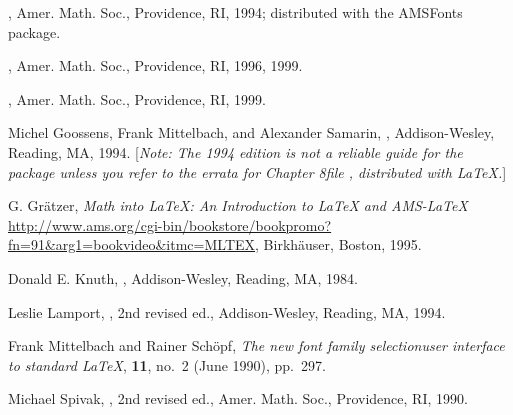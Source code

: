 \begin{thebibliography}{9}

,
Amer. Math. Soc., Providence, RI, 1994; distributed
with the AMSFonts package.

,
Amer. Math. Soc., Providence, RI, 1996, 1999.

,
Amer. Math. Soc., Providence, RI, 1999.

 Michel Goossens, Frank Mittelbach, and Alexander Samarin,
, Addison-Wesley, Reading, MA, 1994.
  [\emph{Note: The 1994 edition is not a reliable guide for the
     package unless you refer to the errata for Chapter
    8\mdash file , distributed with \LaTeX{}.}]

\begin{raggedright}
 G. Gr\"{a}tzer,
\emph{Math into \LaTeX{}: An Introduction to \LaTeX{} and AMS-\LaTeX{}}
  \url{http://www.ams.org/cgi-bin/bookstore/bookpromo?fn=91&arg1=bookvideo&itmc=MLTEX},
Birkh\"{a}user, Boston, 1995.\par
\end{raggedright}

 Donald E. Knuth, ,
Addison-Wesley, Reading, MA, 1984.

 Leslie Lamport, , 2nd revised ed., Addison-Wesley, Reading, MA, 1994.

 Frank Mittelbach and Rainer Sch\"opf,
\textit{The new font family selection\mdash user
interface to standard \LaTeX{}},  \textbf{11},
no.~2 (June 1990), pp.~297.

 Michael Spivak, , 2nd revised ed.,
Amer. Math. Soc., Providence, RI, 1990.

\end{thebibliography}



